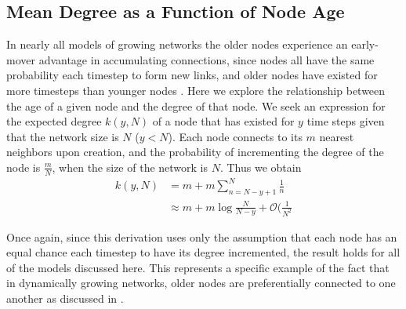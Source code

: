 \documentclass[aps,pre,reprint,superscriptaddress,amsmath,amssymb]{revtex4-1}
\begin{document}
\subsection{Mean Degree as a Function of Node Age}
In nearly all models of growing networks the older nodes experience an early-mover advantage in accumulating connections, since nodes all have the same probability each timestep to form new links, and older nodes have existed for more timesteps than younger nodes \cite{reallyrandom}.
Here we explore the relationship between the age of a given node and the degree of that node. 
We seek an expression for the expected degree $k(y,N)$ of a node that has existed for $y$ time steps given that the network size is $N$ ($y < N$).
Each node connects to its $m$ nearest neighbors upon creation, and the probability of incrementing the degree of the node is $\frac{m}{N}$, when the size of the network is $N$.
Thus we obtain 
\begin{equation}
\begin{split}
k(y,N)& = m + m\sum_{n=N-y+1}^{N} \frac{1}{n}\\
      & \approx m + m \log \frac{N}{N-y} + \mathcal O(\frac{1}{N^2}
\end{split}
\end{equation}
 
Once again, since this derivation uses only the assumption that each node has an equal chance each timestep to have its degree incremented, the result holds for all of the models discussed here.
This represents a specific example of the fact that in dynamically growing networks, older nodes are preferentially connected to one another as discussed in \cite{reallyrandom}.

\end{document}
